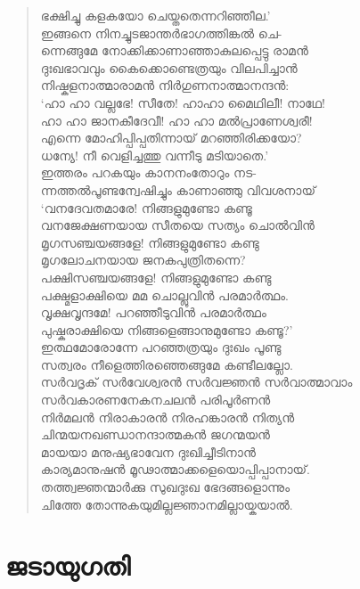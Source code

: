 \begin{verse}
ഭക്ഷിച്ചു കളകയോ ചെയ്തതെന്നറിഞ്ഞീല.’\\
ഇങ്ങനെ നിനച്ചുടജാന്തര്‍ഭാഗത്തിങ്കല്‍ ചെ-\\
ന്നെങ്ങുമേ നോക്കിക്കാണാഞ്ഞാകുലപ്പെട്ടു രാമന്‍\\
ദുഃഖഭാവവും കൈക്കൊണ്ടെത്രയും വിലപിച്ചാന്‍\\
നിഷ്കളനാത്മാരാമന്‍ നിര്‍ഗുണനാത്മാനന്ദന്‍:\\
‘ഹാ ഹാ വല്ലഭേ! സീതേ! ഹാഹാ മൈഥിലീ! \hbox{നാഥേ!}\\
ഹാ ഹാ ജാനകീദേവീ! ഹാ ഹാ മല്‍പ്രാണേശ്വരീ!\\
എന്നെ മോഹിപ്പിപ്പതിന്നായ് മറഞ്ഞിരിക്കയോ?\\
ധന്യേ! നീ വെളിച്ചത്തു വന്നീടു മടിയാതെ.’\\
ഇത്തരം പറകയും കാനനംതോറും നട-\\
ന്നത്തല്‍പൂണ്ടന്വേഷിച്ചും കാണാഞ്ഞു വിവശനായ്\\
‘വനദേവതമാരേ! നിങ്ങളുമുണ്ടോ കണ്ടൂ\\
വനജേക്ഷണയായ സീതയെ സത്യം ചൊല്‍വിന്‍\\
മൃഗസഞ്ചയങ്ങളേ! നിങ്ങളുമുണ്ടോ കണ്ടു\\
മൃഗലോചനയായ ജനകപുത്രിതന്നെ?\\
പക്ഷിസഞ്ചയങ്ങളേ! നിങ്ങളുമുണ്ടോ കണ്ടു\\
പക്ഷ്മളാക്ഷിയെ മമ ചൊല്ലുവിന്‍ പരമാര്‍ത്ഥം.\\
വൃക്ഷവൃന്ദമേ! പറഞ്ഞീടുവിന്‍ പരമാര്‍ത്ഥം\\
പുഷ്കരാക്ഷിയെ നിങ്ങളെങ്ങാനുമുണ്ടോ കണ്ടൂ?’\\
ഇത്ഥമോരോന്നേ പറഞ്ഞത്രയും ദുഃഖം പൂണ്ടു\\
സത്വരം നീളെത്തിരഞ്ഞെങ്ങുമേ കണ്ടീലല്ലോ.\\
സര്‍വദൃക് സര്‍വേശ്വരന്‍ സര്‍വജ്ഞന്‍ സര്‍വാത്മാവാം\\
സര്‍വകാരണനേകനചലന്‍ പരിപൂര്‍ണന്‍\\
നിര്‍മലന്‍ നിരാകാരന്‍ നിരഹങ്കാരന്‍ നിത്യന്‍\\
ചിന്മയനഖണ്ഡാനന്ദാത്മകന്‍ ജഗന്മയന്‍\\
മായയാ മനുഷ്യഭാവേന ദുഃഖിച്ചീടിനാന്‍\\
കാര്യമാനുഷന്‍ മൂഢാത്മാക്കളെയൊപ്പിപ്പാനായ്.\\
തത്ത്വജ്ഞന്മാര്‍ക്കു സുഖദുഃഖ ഭേദങ്ങളൊന്നും\\
ചിത്തേ തോന്നുകയുമില്ലജ്ഞാനമില്ലായ്കയാല്‍.
\end{verse}

\section{ജടായുഗതി}

